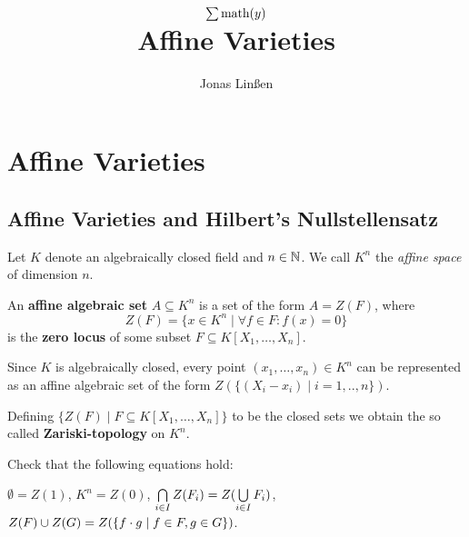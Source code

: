 

\title{
	$\sum \text{math}(y)$\\
	Affine Varieties
}
\author{Jonas Linßen}


	\maketitle
	\tableofcontents

	\newpage
	\section{Affine Varieties}
	\subsection{Affine Varieties and Hilbert's Nullstellensatz}

	\begin{convention}
		Let $K$ denote an algebraically closed field and $n \in \mathbb{N}$. We call $K^n$ the \textit{affine space} of dimension $n$.
	\end{convention}

	\begin{definition}
		An \textbf{affine algebraic set} $A \subseteq K^n$ is a set of the form $A = Z(F)$, where
		\begin{equation*}
			Z(F) = \{x \in K^n \mid \forall f \in F: f(x) = 0\}
		\end{equation*}
		is the \textbf{zero locus} of some subset $F \subseteq K[X_1, \dots, X_n]$.
	\end{definition}

	\begin{remark}
				Since $K$ is algebraically closed, every point $(x_1, \dots, x_n) \in K^n$ can be represented as an affine algebraic set of the form $Z(\{(X_i - x_i) \mid i = 1, .., n\})$.
	\end{remark}

	\begin{definition}
		Defining $\{Z(F) \mid F \subseteq K[X_1, \dots, X_n]\}$ to be the closed sets we obtain the so called \textbf{Zariski-topology} on $K^n$.
	\end{definition}
	\begin{sketch}
		Check that the following equations hold:

		$\emptyset = Z(1)$, $K^n = Z({0})$, $\bigcap \limits_{i \in I} Z(F_i) = Z(\bigcup \limits_{i \in I} F_i)$, $Z(F) \cup Z(G) = Z(\{f \cdot g \mid f \in F, g \in G\})$.
	\end{sketch}

